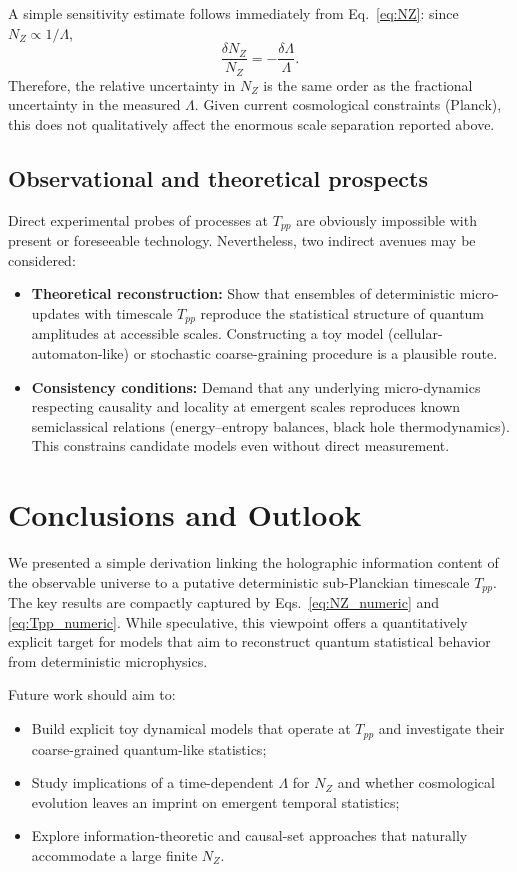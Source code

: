 \documentclass[12pt]{article}
\begin{document}
A simple sensitivity estimate follows immediately from Eq.~\eqref{eq:NZ}: since $N_Z\propto 1/\Lambda$,
\begin{equation}
\frac{\delta N_Z}{N_Z} = -\frac{\delta\Lambda}{\Lambda}.
\end{equation}
Therefore, the relative uncertainty in $N_Z$ is the same order as the fractional uncertainty in the measured $\Lambda$. Given current cosmological constraints (Planck), this does not qualitatively affect the enormous scale separation reported above.

\subsection{Observational and theoretical prospects}
Direct experimental probes of processes at $T_{pp}$ are obviously impossible with present or foreseeable technology. Nevertheless, two indirect avenues may be considered:
\begin{itemize}
  \item \textbf{Theoretical reconstruction:} Show that ensembles of deterministic micro-updates with timescale $T_{pp}$ reproduce the statistical structure of quantum amplitudes at accessible scales. Constructing a toy model (cellular-automaton-like) or stochastic coarse-graining procedure is a plausible route.
  \item \textbf{Consistency conditions:} Demand that any underlying micro-dynamics respecting causality and locality at emergent scales reproduces known semiclassical relations (energy–entropy balances, black hole thermodynamics). This constrains candidate models even without direct measurement.
\end{itemize}

\section{Conclusions and Outlook}
We presented a simple derivation linking the holographic information content of the observable universe to a putative deterministic sub-Planckian timescale $T_{pp}$. The key results are compactly captured by Eqs.~\eqref{eq:NZ_numeric} and \eqref{eq:Tpp_numeric}. While speculative, this viewpoint offers a quantitatively explicit target for models that aim to reconstruct quantum statistical behavior from deterministic microphysics.

Future work should aim to:
\begin{itemize}
  \item Build explicit toy dynamical models that operate at $T_{pp}$ and investigate their coarse-grained quantum-like statistics;
  \item Study implications of a time-dependent $\Lambda$ for $N_Z$ and whether cosmological evolution leaves an imprint on emergent temporal statistics;
  \item Explore information-theoretic and causal-set approaches that naturally accommodate a large finite $N_Z$.
\end{itemize}
\end{document}
